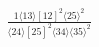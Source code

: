 \documentclass[varwidth, border=5pt]{standalone}
\begin{document}
\begin{my}
$\begin{gathered}
\scriptscriptstyle\frac{1⟨13⟩[12]^2⟨25⟩^2}{⟨24⟩[25]^2⟨34⟩⟨35⟩^2}
\end{gathered}$
\end{my}
\end{document}
